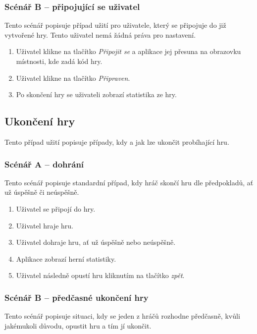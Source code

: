 \subsubsection*{Scénář B -- připojující se uživatel}

Tento scénář popisuje případ užití pro uživatele,
který se připojuje do již vytvořené hry.
Tento uživatel nemá žádná práva pro nastavení.

\begin{enumerate}
    \item Uživatel klikne na tlačítko \emph{Připojit se}
    a aplikace jej přesuna na obrazovku místnosti,
    kde zadá kód hry.
    \item Uživatel klikne na tlačítko \emph{Připraven}.
    \item Po skončení hry se uživateli zobrazí statistika ze hry.
\end{enumerate}

\subsection{Ukončení hry}

Tento případ užití popisuje případy,
kdy a jak lze ukončit probíhající hru.

\subsubsection*{Scénář A -- dohrání}

Tento scénář popisuje standardní případ,
kdy hráč skončí hru dle předpokladů,
ať už úspěšně či neúspěšně.

\begin{enumerate}
    \item Uživatel se připojí do hry.
    \item Uživatel hraje hru.
    \item Uživatel dohraje hru, ať už úspěšně nebo neúspěšně.
    \item Aplikace zobrazí herní statistiky.
    \item Uživatel následně opustí hru kliknutím na tlačítko \emph{zpět}.
\end{enumerate}

\subsubsection*{Scénář B -- předčasné ukončení hry}

Tento scénář popisuje situaci,
kdy se jeden z hráčů rozhodne předčasně,
kvůli jakémukoli důvodu,
opustit hru a tím jí ukončit. 

